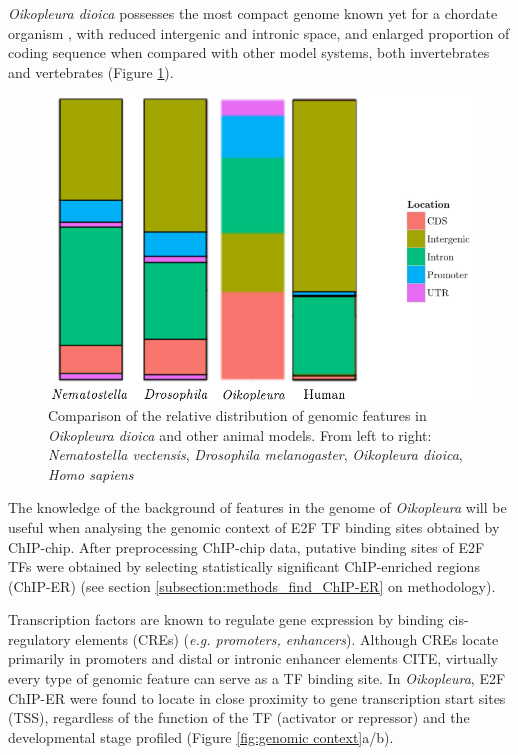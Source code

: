 \documentclass[11pt,twoside,a4paper]{report}
\begin{document}
		\textit{Oikopleura dioica} possesses the most compact genome known yet for a chordate organism \cite{Denoeud2010}, with reduced intergenic and intronic space, and enlarged proportion of coding sequence when compared with other model systems, both invertebrates and vertebrates (Figure \ref{fig:genome_background}).
	
		\begin{figure}[here]
			\setlength{\belowcaptionskip}{5pt}
			\centering
			\includegraphics[height=0.3\textwidth]{pngs/species_genome.png}
			\caption{Comparison of the relative distribution of genomic features in \textit{Oikopleura dioica} and other animal models.
			{\footnotesize
				From left to right:
					\textit{Nematostella vectensis},
					\textit{Drosophila melanogaster},
					\textit{Oikopleura dioica},
					\textit{Homo sapiens}
				}
			}
			\label{fig:genome_background}
		\end{figure}
		
		The knowledge of the background of features in the genome of \textit{Oikopleura} will be useful when analysing the genomic context of E2F TF binding sites obtained by ChIP-chip. After preprocessing ChIP-chip data, putative binding sites of E2F TFs were obtained by selecting statistically significant ChIP-enriched regions (ChIP-ER) (see section \ref{subsection:methods_find_ChIP-ER} on methodology).
		
		Transcription factors are known to regulate gene expression by binding cis-regulatory elements (CREs) (\textit{e.g. promoters, enhancers}). Although CREs locate primarily in promoters and distal or intronic enhancer elements CITE, virtually every type of genomic feature can serve as a TF binding site. In \textit{Oikopleura}, E2F ChIP-ER were found to locate in close proximity to gene transcription start sites (TSS), regardless of the function of the TF (activator or repressor) and the developmental stage profiled (Figure \ref{fig:genomic context}a/b). 
				
\end{document}
